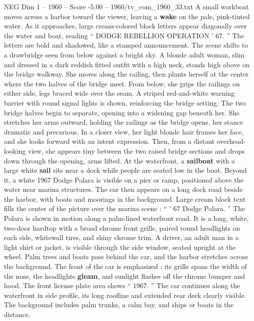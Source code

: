 \begin{textsample}{NEG Dim 1 – 1960 – Score -5.00 – 1960/tv\_com\_1960\_33.txt}  \label{ex:f1_neg_022}
A small workboat moves across a harbor toward the viewer, leaving a \textbf{wake} on the pale, pink-tinted water.
As it approaches, large cream-colored block letters appear diagonally over the water and boat, reading “ DODGE REBELLION OPERATION ’ 67. ” The letters are bold and shadowed, like a stamped announcement.
The scene shifts to a drawbridge seen from below against a bright sky.
A blonde adult woman, slim and dressed in a dark reddish fitted outfit with a high neck, stands high above on the bridge walkway.
She moves along the railing, then plants herself at the center where the two halves of the bridge meet.
From below, she grips the railings on either side, legs braced wide over the seam.
A striped red-and-white warning barrier with round signal lights is shown, reinforcing the bridge setting.
The two bridge halves begin to separate, opening into a widening gap beneath her.
She stretches her arms outward, holding the railings as the bridge opens, her stance dramatic and precarious.
In a closer view, her light blonde hair frames her face, and she looks forward with an intent expression.
Then, from a distant overhead-looking view, she appears tiny between the two raised bridge sections and drops down through the opening, arms lifted.
At the waterfront, a \textbf{sailboat} with a large white \textbf{sail} sits near a dock while people are seated low in the boat.
Beyond it, a white 1967 Dodge Polara is visible on a pier or ramp, positioned above the water near marina structures.
The car then appears on a long dock road beside the harbor, with boats and moorings in the background.
Large cream block text fills the center of the picture over the marina scene : “ ’ 67 Dodge Polara. ” The Polara is shown in motion along a palm-lined waterfront road.
It is a long, white, two-door hardtop with a broad chrome front grille, paired round headlights on each side, whitewall tires, and shiny chrome trim.
A driver, an adult man in a light shirt or jacket, is visible through the side window, seated upright at the wheel.
Palm trees and boats pass behind the car, and the harbor stretches across the background.
The front of the car is emphasized : its grille spans the width of the nose, the headlights \textbf{gleam}, and sunlight flashes off the chrome bumper and hood.
The front license plate area shows “ 1967. ” The car continues along the waterfront in side profile, its long roofline and extended rear deck clearly visible.
The background includes palm trunks, a calm bay, and ships or boats in the distance.

\end{textsample}
